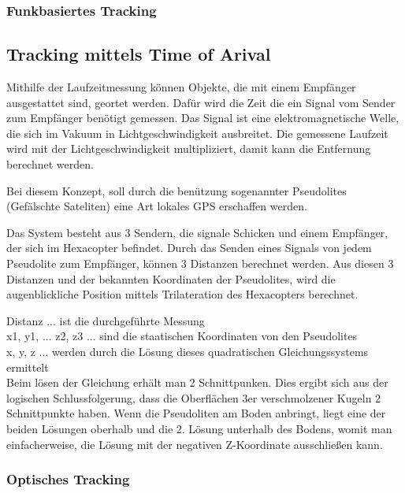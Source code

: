    \subsubsection{Funkbasiertes Tracking}

      \subsection*{Tracking mittels Time of Arival}

      Mithilfe der Laufzeitmessung können Objekte, die mit einem Empfänger ausgestattet sind, geortet werden. Dafür wird die Zeit die ein Signal vom Sender zum Empfänger benötigt gemessen. Das Signal ist eine elektromagnetische Welle, die sich im Vakuum in Lichtgeschwindigkeit ausbreitet. Die gemessene Laufzeit wird mit der Lichtgeschwindigkeit multipliziert, damit kann die Entfernung berechnet werden. 

      Bei diesem Konzept, soll durch die benützung sogenannter Pseudolites (Gefälschte Sateliten) eine Art lokales GPS erschaffen werden.

      Das System besteht aus 3 Sendern, die signale Schicken und einem Empfänger, der sich im Hexacopter befindet.
      Durch das Senden eines Signals von jedem Pseudolite zum Empfänger, können 3 Distanzen berechnet werden.
      Aus diesen 3 Distanzen und der bekannten Koordinaten der Pseudolites, wird die augenblickliche Position mittels Trilateration des Hexacopters berechnet.


      Distanz ... ist die durchgeführte Messung\\
      x1, y1, ... z2, z3 ... sind die staatischen Koordinaten von den Pseudolites \\
      x, y, z ... werden durch die Lösung dieses quadratischen Gleichungssystems ermittelt \\
      
      Beim lösen der Gleichung erhält man 2 Schnittpunken. Dies ergibt sich aus der logischen Schlussfolgerung, dass die Oberflächen 3er verschmolzener Kugeln 2 Schnittpunkte haben.
      Wenn die Pseudoliten am Boden anbringt, liegt eine der beiden Lösungen oberhalb und die 2. Lösung unterhalb des Bodens, womit man einfacherweise, die Lösung mit der negativen Z-Koordinate ausschließen kann.

    \subsubsection{Optisches Tracking}

